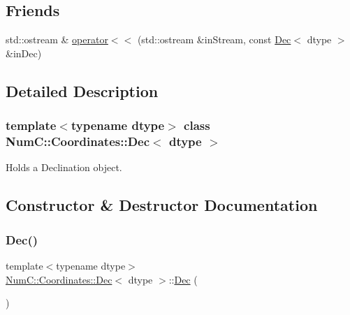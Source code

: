 \subsection*{Friends}
\begin{DoxyCompactItemize}
\item 
std\+::ostream \& \mbox{\hyperlink{class_num_c_1_1_coordinates_1_1_dec_aa501ef35ac052d5084d792bfcde2345f}{operator$<$$<$}} (std\+::ostream \&in\+Stream, const \mbox{\hyperlink{class_num_c_1_1_coordinates_1_1_dec}{Dec}}$<$ dtype $>$ \&in\+Dec)
\end{DoxyCompactItemize}


\subsection{Detailed Description}
\subsubsection*{template$<$typename dtype$>$\newline
class Num\+C\+::\+Coordinates\+::\+Dec$<$ dtype $>$}

Holds a Declination object. 

\subsection{Constructor \& Destructor Documentation}
\mbox{\label{class_num_c_1_1_coordinates_1_1_dec_ac55f97b493e807657cd2a1596da382fd}} 
\subsubsection{\texorpdfstring{Dec()}{Dec()}\hspace{0.1cm}{\footnotesize\ttfamily [1/3]}}
{\footnotesize\ttfamily template$<$typename dtype$>$ \\
\mbox{\hyperlink{class_num_c_1_1_coordinates_1_1_dec}{Num\+C\+::\+Coordinates\+::\+Dec}}$<$ dtype $>$\+::\mbox{\hyperlink{class_num_c_1_1_coordinates_1_1_dec}{Dec}} (\begin{DoxyParamCaption}{ }\end{DoxyParamCaption})\hspace{0.3cm}{\ttfamily [inline]}}


